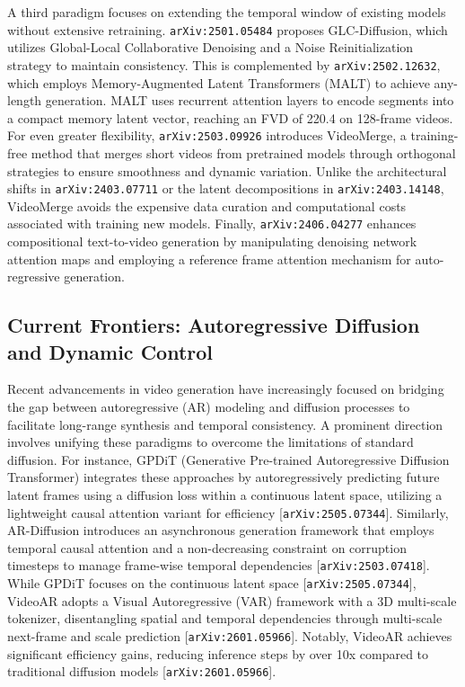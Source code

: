 \documentclass[11pt]{article}
\begin{document}
A third paradigm focuses on extending the temporal window of existing models without extensive retraining. \texttt{arXiv:2501.05484} proposes GLC-Diffusion, which utilizes Global-Local Collaborative Denoising and a Noise Reinitialization strategy to maintain consistency. This is complemented by \texttt{arXiv:2502.12632}, which employs Memory-Augmented Latent Transformers (MALT) to achieve any-length generation. MALT uses recurrent attention layers to encode segments into a compact memory latent vector, reaching an FVD of 220.4 on 128-frame videos. For even greater flexibility, \texttt{arXiv:2503.09926} introduces VideoMerge, a training-free method that merges short videos from pretrained models through orthogonal strategies to ensure smoothness and dynamic variation. Unlike the architectural shifts in \texttt{arXiv:2403.07711} or the latent decompositions in \texttt{arXiv:2403.14148}, VideoMerge avoids the expensive data curation and computational costs associated with training new models. Finally, \texttt{arXiv:2406.04277} enhances compositional text-to-video generation by manipulating denoising network attention maps and employing a reference frame attention mechanism for auto-regressive generation.

\subsection{Current Frontiers: Autoregressive Diffusion and Dynamic Control}

Recent advancements in video generation have increasingly focused on bridging the gap between autoregressive (AR) modeling and diffusion processes to facilitate long-range synthesis and temporal consistency. A prominent direction involves unifying these paradigms to overcome the limitations of standard diffusion. For instance, GPDiT (Generative Pre-trained Autoregressive Diffusion Transformer) integrates these approaches by autoregressively predicting future latent frames using a diffusion loss within a continuous latent space, utilizing a lightweight causal attention variant for efficiency [\texttt{arXiv:2505.07344}]. Similarly, AR-Diffusion introduces an asynchronous generation framework that employs temporal causal attention and a non-decreasing constraint on corruption timesteps to manage frame-wise temporal dependencies [\texttt{arXiv:2503.07418}]. While GPDiT focuses on the continuous latent space [\texttt{arXiv:2505.07344}], VideoAR adopts a Visual Autoregressive (VAR) framework with a 3D multi-scale tokenizer, disentangling spatial and temporal dependencies through multi-scale next-frame and scale prediction [\texttt{arXiv:2601.05966}]. Notably, VideoAR achieves significant efficiency gains, reducing inference steps by over 10x compared to traditional diffusion models [\texttt{arXiv:2601.05966}].
\end{document}
